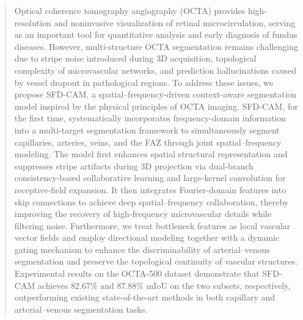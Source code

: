 \documentclass[times, review, 10pt]{elsarticle}
\begin{document}
\begin{CJK}{UTF8}{gbsn}
\begin{frontmatter}
\begin{abstract}
Optical coherence tomography angiography (OCTA) provides high-resolution and noninvasive visualization of retinal microcirculation, serving as an important tool for quantitative analysis and early diagnosis of fundus diseases. However, multi-structure OCTA segmentation remains challenging due to stripe noise introduced during 3D acquisition, topological complexity of microvascular networks, and prediction hallucinations caused by vessel dropout in pathological regions. To address these issues, we propose SFD-CAM, a spatial–frequency-driven context-aware segmentation model inspired by the physical principles of OCTA imaging. SFD-CAM, for the first time, systematically incorporates frequency-domain information into a multi-target segmentation framework to simultaneously segment capillaries, arteries, veins, and the FAZ through joint spatial–frequency modeling. The model first enhances spatial structural representation and suppresses stripe artifacts during 3D projection via dual-branch consistency-based collaborative learning and large-kernel convolution for receptive-field expansion. It then integrates Fourier-domain features into skip connections to achieve deep spatial–frequency collaboration, thereby improving the recovery of high-frequency microvascular details while filtering noise. Furthermore, we treat bottleneck features as local vascular vector fields and employ directional modeling together with a dynamic gating mechanism to enhance the discriminability of arterial–venous segmentation and preserve the topological continuity of vascular structures. Experimental results on the OCTA-500 dataset demonstrate that SFD-CAM achieves 82.67\% and 87.88\% mIoU on the two subsets, respectively, outperforming existing state-of-the-art methods in both capillary and arterial–venous segmentation tasks.
\end{abstract}



\end{frontmatter}
\end{CJK}
\end{document}
